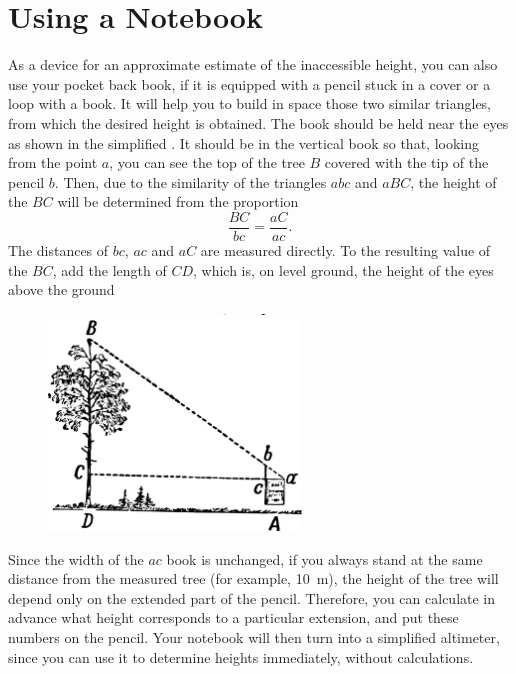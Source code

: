 \clearpage

\section{Using a Notebook}
\label{sec-1.5}

As a device for an approximate estimate of the inaccessible height, you can also use your pocket back book, if it is equipped with a pencil stuck in a cover or a loop with a book. It will help you to build in space those two similar triangles, from which the desired height is obtained. The book should be held near the eyes as shown in the simplified . It should be in the vertical book so that, looking from the point $a$, you can see the top of the tree $B$ covered with the tip of the pencil $b$. Then, due to the similarity of the triangles $abc$ and $aBC$, the height of the $BC$ will be determined from the proportion
\begin{equation*}%
\frac{BC}{bc} = \frac{aC}{ac}.
\end{equation*}
The distances of $bc$, $ac$ and $aC$ are measured directly. To the resulting value of the $BC$, add the length of $CD$, which is, on level ground, the height of the eyes above the ground


\begin{figure}[h!]
\centering
\includegraphics[width=0.6\textwidth]{figures/ch-01/fig-01-09.pdf}
\end{figure}

Since the width of the $ac$ book is unchanged, if you always stand at the same distance from the measured tree (for example, \SI{10}{\meter}), the height of the tree will depend only on the extended part of the pencil. Therefore, you can calculate in advance what height corresponds to a particular extension, and put these numbers on the pencil. Your notebook will then turn into a simplified altimeter, since you can use it to determine heights immediately, without calculations.





